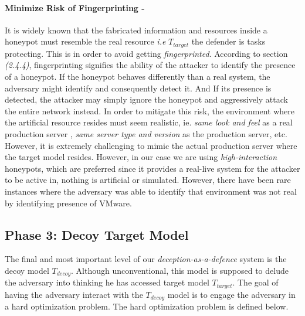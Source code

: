 \documentclass[grad,lot,lof,11pt,oneside,onehalfspace]{RUthesis}
\begin{document}
\paragraph{Minimize Risk of Fingerprinting -}
 It is widely known that the fabricated information and resources inside a honeypot must resemble the real resource \textit{i.e} \textit{$T_{target}$} the defender is tasks protecting. This is in order to avoid getting \textit{fingerprinted}. According to section \textit{(2.4.4)}, fingerprinting signifies the ability of the attacker to identify the presence of a honeypot. If the honeypot behaves differently than a real system, the adversary might identify and consequently detect it. And If its presence is detected, the attacker may simply ignore the honeypot and aggressively attack the entire network instead. In order to mitigate this risk, the environment where the artificial resource resides must seem realistic, ie. \textit{same look and feel} as a real production server , \textit{same server type and version} as the production server, etc. However, it is extremely challenging to mimic the actual production server where the target model resides. However, in our case we are using \textit{high-interaction} honeypots, which are preferred since it provides a real-live system for the attacker to be active in, nothing is artificial or simulated. However, there have been rare instances where the adversary was able to identify that environment was not real by identifying presence of VMware.
\subsection{Phase 3: Decoy Target Model} 
The final and most important level of our \textit{deception-as-a-defence} system is the decoy model \textit{$T_{decoy}$}. Although unconventional, this model is supposed to delude the adversary into thinking he has accessed target model \textit{$T_{target}$}. The goal of having the adversary interact with the \textit{$T_{decoy}$} model is to engage the adversary in a hard optimization problem. The hard optimization problem is defined below. 
\end{document}
